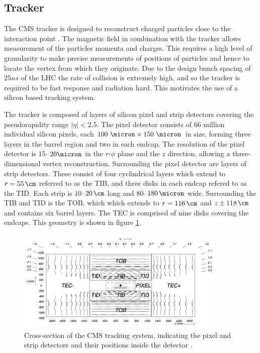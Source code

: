 \subsection{Tracker}
\label{sec:tracker}

The CMS tracker is designed to reconstruct charged particles close to the
interaction point \cite{Chatrchyan:2008aa}. The magnetic field in combination with the tracker allows
measurement of the particles momenta and charges. This requires a high level of
granularity to make precise measurements of positions of particles and hence to
locate the vertex from which they originate. Due to the design bunch spacing of
$25ns$ of the LHC the rate of collision is extremely high, and so the tracker is
required to be fast response and radiation hard. This motivates the use of a
silicon based tracking system.

The tracker is composed of layers of silicon pixel and strip detectors covering
the pseudorapidity range $|\eta| < 2.5$. The pixel detector consists of 66
million individual silicon pixels, each $100~\micron \times 150~\micron$
in size, forming three layers in the barrel region and two in each endcap. The
resolution of the pixel detector is $15$--$20\micron$ in the $r$-$\phi$ plane
and the $z$ direction, allowing a three-dimensional vertex reconstruction.
Surrounding the pixel detector are layers of strip detectors. These consist of
four cyclindrical layers which extend to $r=55\,\cm$ referred to as the
\ac{TIB}, and three disks in each endcap refered to as the \ac{TID}. Each strip
is $10$--$20\,\cm$ long and $80$--$180\,\micron$ wide. Surrounding the \ac{TIB}
and \ac{TID} is the \ac{TOB}, which which extends to $r=116\,\cm$ and
$z\pm118\,\cm$ and contains six barrel layers. The \ac{TEC} is comprised of nine
disks covering the endcaps. This geometry is shown in figure
\ref{fig:trackerlayout}.

\begin{figure}[htbp]
   \includegraphics[width=0.9\textwidth]{plots/detector/tracker_layout.png}
\caption{Cross-section of the CMS tracking system, indicating the pixel and
strip detectors and their positions inside the detector \cite{Chatrchyan:2008aa}.}
\label{fig:trackerlayout}
\end{figure}

